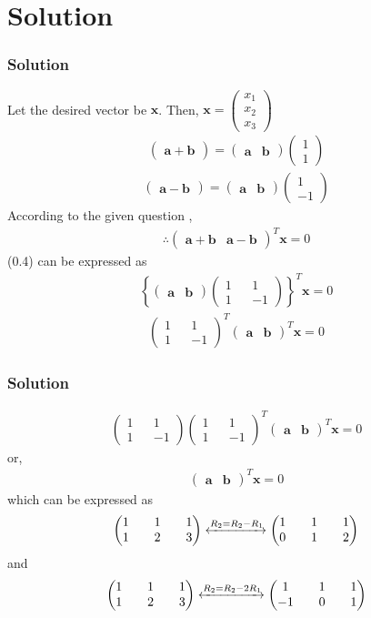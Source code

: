\documentclass{beamer}
\providecommand{\cbrak}[1]{\ensuremath{\left\{#1\right\}}}
\theoremstyle{remark}
\newcommand{\myvec}[1]{\ensuremath{\begin{pmatrix}#1\end{pmatrix}}}
\let\vec\mathbf
\numberwithin{equation}{section}
\begin{document}
\section{Solution}
\begin{frame}
\frametitle{Solution}
\setcounter{section}{1}
Let the desired vector be $\vec{x}$.
Then,
$\vec{x}=\myvec{x_1 \\
x_2\\
x_3}$
\begin{align}
\myvec{\vec{a}+\vec{b}}=\myvec{\vec{a}&\vec{b}}\myvec{1\\1}
\end{align}
\begin{align}
\myvec{\vec{a}-\vec{b}}=\myvec{\vec{a}&\vec{b}}\myvec{1\\-1}
\end{align}
According to the given question ,
\begin{align}
    \therefore \myvec{\vec{a}+\vec{b}&\vec{a}-\vec{b}}^T\vec{x}=0
\end{align}
(0.4) can be expressed as
\begin{align}
    \cbrak{{\myvec{\vec{a}&\vec{b}}\myvec{1&&1\\1&&-1}}}^T\vec{x}=0
    \end{align}
    \begin{align}
       \myvec{1&&1\\1&&-1}^T \myvec{\vec{a}&\vec{b}}^T\vec{x}=0
    \end{align}
\end{frame}
\begin{frame}
\frametitle{Solution}
\begin{align}
         \myvec{1&&1\\1&&-1}\myvec{1&&1\\1&&-1}^T \myvec{\vec{a}&\vec{b}}^T\vec{x}=0
    \end{align}
    or,
    \begin{align}
        \myvec{\vec{a}&\vec{b}}^T\vec{x}=0
    \end{align}
which can be expressed as 
\begin{align}
    \myvec{1&&1&&1\\1&&2&&3}
    \xleftrightarrow{ R_2 = R_2 - R_1}
    \myvec{1&&1&&1\\0&&1&&2}
    \end{align}
    and
    \begin{align}
     \myvec{1&&1&&1\\1&&2&&3}
    \xleftrightarrow{ R_2 = R_2 - 2R_1}
    \myvec{1&&1&&1\\-1&&0&&1}
\end{align}
\end{frame}
\end{document}
